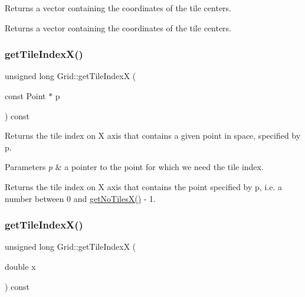 Returns a vector containing the coordinates of the tile centers. \begin{DoxyReturn}{Returns}
a vector containing the coordinates of the tile centers. 
\end{DoxyReturn}
\mbox{\label{class_grid_af4094832e2adedbbd47889973f5a40da}} 
\subsubsection{\texorpdfstring{get\+Tile\+Index\+X()}{getTileIndexX()}\hspace{0.1cm}{\footnotesize\ttfamily [1/2]}}
{\footnotesize\ttfamily unsigned long Grid\+::get\+Tile\+IndexX (\begin{DoxyParamCaption}\item[{const Point $\ast$}]{p }\end{DoxyParamCaption}) const}

Returns the tile index on X axis that contains a given point in space, specified by p. 
\begin{DoxyParams}{Parameters}
{\em p} & a pointer to the point for which we need the tile index. \\
\hline
\end{DoxyParams}
\begin{DoxyReturn}{Returns}
the tile index on X axis that contains the point specified by p, i.\+e. a number between 0 and \hyperlink{class_grid_af29c0c404a908aa46f83afb17d7609a6}{get\+No\+Tiles\+X()} -\/ 1. 
\end{DoxyReturn}
\mbox{\label{class_grid_a5ab67c336ac08c690a0e8b03c12f02e5}} 
\subsubsection{\texorpdfstring{get\+Tile\+Index\+X()}{getTileIndexX()}\hspace{0.1cm}{\footnotesize\ttfamily [2/2]}}
{\footnotesize\ttfamily unsigned long Grid\+::get\+Tile\+IndexX (\begin{DoxyParamCaption}\item[{double}]{x }\end{DoxyParamCaption}) const}

